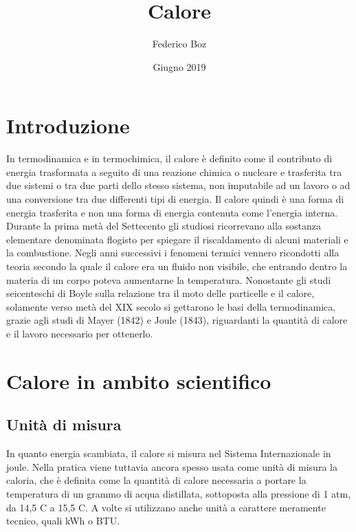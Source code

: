 \documentclass[a4paper]{report}
\title{Calore}
\author{Federico Boz}
\date{Giugno 2019}
\begin{document}
\maketitle
\tableofcontents

\chapter*{Introduzione}
    In termodinamica e in termochimica, il calore è definito come il contributo di energia trasformata a seguito di una reazione chimica o nucleare e trasferita tra due sistemi o tra due parti dello stesso sistema, non imputabile ad un lavoro o ad una conversione tra due differenti tipi di energia. Il calore quindi è una forma di energia trasferita e non una forma di energia contenuta come l'energia interna.
    \newline
    Durante la prima metà del Settecento gli studiosi ricorrevano alla sostanza elementare denominata flogisto per spiegare il riscaldamento di alcuni materiali e la combustione.
    Negli anni successivi i fenomeni termici vennero ricondotti alla teoria secondo la quale il calore era un fluido non visibile, che entrando dentro la materia di un corpo poteva aumentarne la temperatura.
    Nonostante gli studi seicenteschi di Boyle sulla relazione tra il moto delle particelle e il calore, solamente verso metà del XIX secolo si gettarono le basi della termodinamica, grazie agli studi di Mayer (1842) e Joule (1843), riguardanti la quantità di calore e il lavoro necessario per ottenerlo.
    
\chapter{Calore in ambito scientifico}
\section{Unità di misura}
    In quanto energia scambiata, il calore si misura nel Sistema Internazionale in joule. Nella pratica viene tuttavia ancora spesso usata come unità di misura la caloria, che è definita come la quantità di calore necessaria a portare la temperatura di un grammo di acqua distillata, sottoposta alla pressione di 1 atm, da 14,5 \degree C a 15,5 \degree C. A volte si utilizzano anche unità a carattere meramente tecnico, quali kWh o BTU.
    
\end{document}
